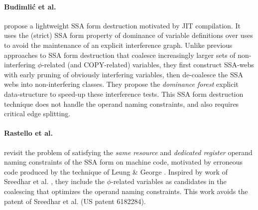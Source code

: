 \paragraph{Budimli\'c et al. \cite{Budimlic:2002:PLDI}} propose a lightweight SSA form
destruction motivated by JIT compilation. It uses the (strict) SSA form property
of dominance of variable definitions over uses to avoid the maintenance of an
explicit interference graph. Unlike previous approaches to SSA form destruction
that coalesce increasingly larger sets of non-interfering $\phi$-related (and
COPY-related) variables, they first construct SSA-webs with early pruning of
obviously interfering variables, then de-coalesce the SSA webs into
non-interfering classes.  They propose the \emph{dominance forest} explicit
data-structure to speed-up these interference tests. This SSA form destruction
technique does not handle the operand naming constraints, and also requires
critical edge splitting.

\paragraph{Rastello et al. \cite{Rastello:2004:CGO}} revisit the problem of
satisfying the \emph{same resource} and \emph{dedicated register} operand naming
constraints of the SSA form on machine code, motivated by erroneous code
produced by the technique of Leung \& George \cite{Leung:1999:PLDI}. Inspired by
work of Sreedhar et al.  \cite{Sreedhar:1999:SAS}, they include the
$\phi$-related variables as candidates in the coalescing that optimizes the
operand naming constraints.  This work avoids the patent of Sreedhar et al. (US
patent 6182284).


